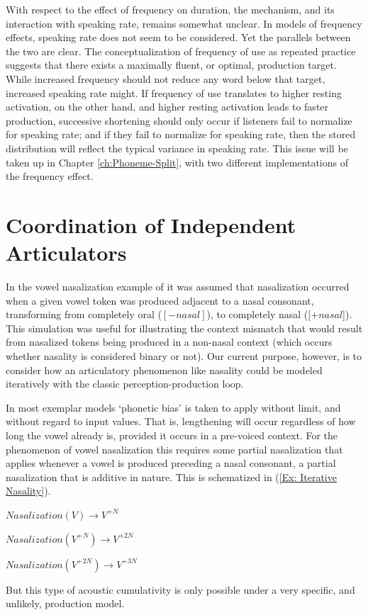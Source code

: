 With respect to the effect of frequency on duration, the mechanism,
and its interaction with speaking rate, remains somewhat unclear.
In models of frequency effects, speaking rate does not seem to be
considered. Yet the parallels between the two are clear. The conceptualization
of frequency of use as repeated practice suggests that there exists
a maximally fluent, or optimal, production target. While increased
frequency should not reduce any word below that target, increased
speaking rate might. If frequency of use translates to higher resting
activation, on the other hand, and higher resting activation leads
to faster production, successive shortening should only occur if listeners
fail to normalize for speaking rate; and if they fail to normalize
for speaking rate, then the stored distribution will reflect the typical
variance in speaking rate. This issue will be taken up in Chapter
\ref{ch:Phoneme-Split}, with two different implementations of the
frequency effect.

\section{Coordination of Independent Articulators}

In the vowel nasalization example of 
it was assumed that nasalization occurred when a given vowel token
was produced adjacent to a nasal consonant, transforming from completely
oral ($[-nasal]$), to completely nasal ($[+nasal${]}). This simulation
was useful for illustrating the context mismatch that would result
from nasalized tokens being produced in a non-nasal context (which
occurs whether nasality is considered binary or not). Our current
purpose, however, is to consider how an articulatory phenomenon like
nasality could be modeled iteratively with the classic perception-production
loop. 

In most exemplar models `phonetic bias' is taken to apply without
limit, and without regard to input values. That is, lengthening will
occur regardless of how long the vowel already is, provided it occurs
in a pre-voiced context. For the phenomenon of vowel nasalization
this requires some partial nasalization that applies whenever a vowel
is produced preceding a nasal consonant, a partial nasalization that
is additive in nature. This is schematized in (\ref{Ex: Iterative Nasality}). 
\begin{covexample}
\label{Ex: Iterative Nasality}$\textit{Nasalization}(V)\rightarrow V^{+N}$

$\textit{Nasalization}(V^{+N})\rightarrow V^{+2N}$

$\textit{Nasalization}(V^{+2N})\rightarrow V^{+3N}$
\end{covexample}
But this type of acoustic cumulativity is only possible under a very
specific, and unlikely, production model. 

